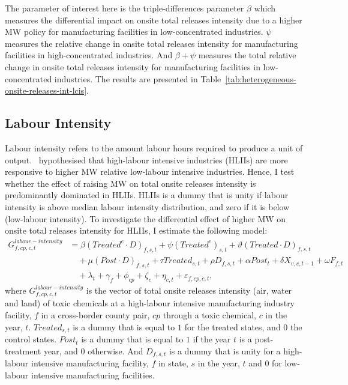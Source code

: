\documentclass[12pt, english]{article}
\begin{document}
    The parameter of interest here is the triple-differences parameter $\beta$ which measures the differential impact on onsite total releases intensity due to a higher MW policy for manufacturing facilities in low-concentrated industries. $\psi$ measures the relative change in onsite total releases intensity for manufacturing facilities in high-concentrated industries. And $\beta + \psi$ measures the total relative change in onsite total releases intensity for manufacturing facilities in low-concentrated industries. The results are presented in Table~\ref{tab:heterogeneous-onsite-releases-int-lcis}.
    

    \subsection{Labour Intensity}\label{subsec:labour-intensity}
    Labour intensity refers to the amount labour hours required to produce a unit of output.~\cite{zhang2023unintended} hypothesised that high-labour intensive industries (HLIIs) are more responsive to higher MW relative low-labour intensive industries. Hence, I test whether the effect of raising MW on total onsite releases intensity is predominantly dominated in HLIIs. HLIIs is a dummy that is unity if labour intensity is above median labour intensity distribution, and zero if it is below (low-labour intensity). To investigate the differential effect of higher MW on onsite total releases intensity for HLIIs, I estimate the following model:
    \begin{align}
        G_{f,cp,c,t}^{labour-intensity} &= \beta (Treated^{e} \cdot D)_{f,s,t} + \psi (Treated^{e})_{s,t} + \vartheta (Treated \cdot D)_{f,s,t} \nonumber \\
        &\quad + \mu (Post \cdot D)_{f,s,t} + \tau Treated_{s,t} + \rho D_{f,s,t} + \alpha Post_{t} + \delta X_{v,c,t-1} + \omega F_{f,t} \nonumber \\
        &\quad + \lambda_{t} + \gamma_{f} + \phi_{cp} + \zeta_{c} + \eta_{c,t} + \varepsilon_{f,cp,c,t},\label{eq:heterogeneous-onsite-releases-intensity-liis}
    \end{align}
    where $G_{f,cp,c,t}^{labour-intensity}$ is the vector of total onsite releases intensity (air, water and land) of toxic chemicals at a high-labour intensive manufacturing industry facility, $f$ in a cross-border county pair, $cp$ through a toxic chemical, $c$ in the year, $t$. $Treated_{s,t}$ is a dummy that is equal to $1$ for the treated states, and $0$ the control states. $Post_{t}$ is a dummy that is equal to $1$ if the year $t$ is a post-treatment year, and $0$ otherwise. And $D_{f,s,t}$ is a dummy that is unity for a high-labour intensive manufacturing facility, $f$ in state, $s$ in the year, $t$ and $0$ for low-labour intensive manufacturing facilities.
    
\end{document}
